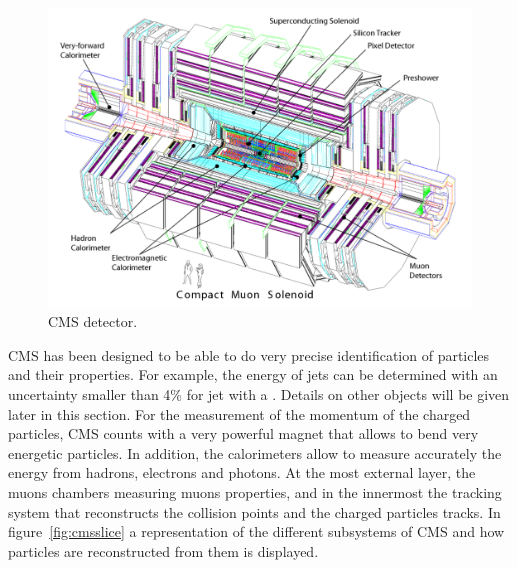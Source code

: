\begin{figure}[!Hhtbp]
  \begin{center}
    \includegraphics[width=\textwidth]{figs/CMS_det.pdf}
    \caption{CMS detector.}
    \label{fig:cmsdet}
  \end{center}
\end{figure}

CMS has been designed to be able to do very precise identification of particles and their properties. For example, the energy of jets can be determined with an uncertainty smaller than 4\% for jet with a . Details on other objects will be given later in this section. For the measurement of the momentum of the charged particles, CMS counts with a very powerful magnet that allows to bend very energetic particles. In addition, the calorimeters allow to measure accurately the energy from hadrons, electrons and photons. At the most external layer, the muons chambers measuring muons properties, and in the innermost the tracking system that reconstructs the collision points and the charged particles tracks. In figure~\ref{fig:cmsslice} a representation of the different subsystems of CMS and how particles are reconstructed from them is displayed.

